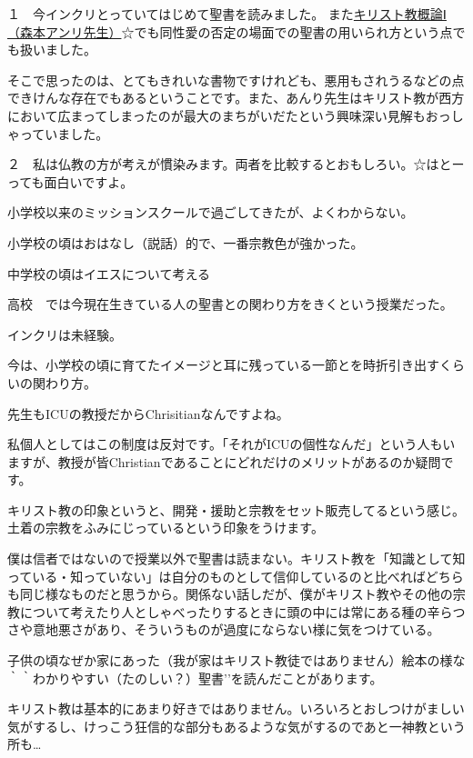 \item
１　今インクリとっていてはじめて聖書を読みました。
また\underline{キリスト教概論Ⅰ（森本アンリ先生）}☆でも同性愛の否定の場面での聖書の用いられ方という点でも扱いました。

そこで思ったのは、とてもきれいな書物ですけれども、悪用もされうるなどの点できけんな存在でもあるということです。また、あんり先生はキリスト教が西方において広まってしまったのが最大のまちがいだたという興味深い見解もおっしゃっていました。

２　私は仏教の方が考えが慣染みます。両者を比較するとおもしろい。☆はとーっても面白いですよ。

\item
小学校以来のミッションスクールで過ごしてきたが、よくわからない。

小学校の頃はおはなし（説話）的で、一番宗教色が強かった。

中学校の頃はイエスについて考える

高校　では今現在生きている人の聖書との関わり方をきくという授業だった。

インクリは未経験。

今は、小学校の頃に育てたイメージと耳に残っている一節とを時折引き出すくらいの関わり方。

\item
先生もICUの教授だからChrisitianなんですよね。

私個人としてはこの制度は反対です。「それがICUの個性なんだ」という人もいますが、教授が皆Christianであることにどれだけのメリットがあるのか疑問です。

キリスト教の印象というと、開発・援助と宗教をセット販売してるという感じ。土着の宗教をふみにじっているという印象をうけます。

\item
僕は信者ではないので授業以外で聖書は読まない。キリスト教を「知識として知っている・知っていない」は自分のものとして信仰しているのと比べればどちらも同じ様なものだと思うから。関係ない話しだが、僕がキリスト教やその他の宗教について考えたり人としゃべったりするときに頭の中には常にある種の辛らつさや意地悪さがあり、そういうものが過度にならない様に気をつけている。

\item
子供の頃なぜか家にあった（我が家はキリスト教徒ではありません）絵本の様な｀｀わかりやすい（たのしい？）聖書’’を読んだことがあります。

キリスト教は基本的にあまり好きではありません。いろいろとおしつけがましい気がするし、けっこう狂信的な部分もあるような気がするのであと一神教という所も…

